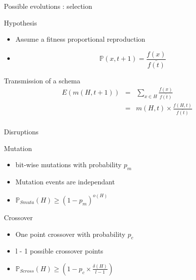 \begin{frame}{Possible evolutions : selection}
  \begin{block}{Hypothesis}
    \begin{itemize}
    \item Assume a fitness proportional reproduction
    \item $$\mathds{P}(x,t+1) = \frac{f(x)}{\bar{f(t)}}$$
    \end{itemize}
  \end{block}

  \begin{block}{Transmission of a schema}
    $$\begin{array}{lll}
      E(m(H,t+1)) & = & \sum\limits_{x \in H} \frac{f(x)}{\bar{f(t)}}\\
      & = & m(H,t) \times \frac{f(H,t)}{\bar{f(t)}}\\
    \end{array}$$
  \end{block}
\end{frame}

\begin{frame}{Disruptions}
  \begin{block}{Mutation}
    \begin{itemize}
    \item bit-wise mutations with probability $p_m$
    \item Mutation events are independant
    \item $\mathds{P}_{Smuta}(H) \geq (1 - p_m)^{o(H)}$
    \end{itemize}
  \end{block}

  \begin{block}{Crossover}
    \begin{itemize}
      \item One point crossover with probability $p_c$
      \item l - 1 possible crossover points
      \item $\mathds{P}_{Scross}(H) \geq (1 - p_c \times \frac{\delta(H)}{l - 1})$
    \end{itemize}
  \end{block}
\end{frame}

